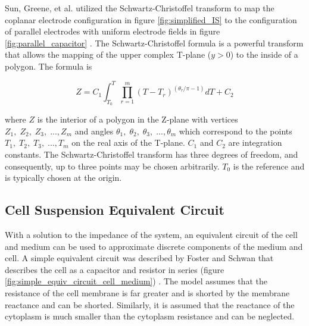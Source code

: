  
    \par Sun, Greene, et al. utilized the Schwartz-Christoffel transform to map the coplanar electrode configuration in figure \ref{fig:simplified_IS} to the configuration of parallel electrodes with uniform electrode fields in figure \ref{fig:parallel_capacitor} \cite{sun_analytical_2007}. The Schwartz-Christoffel formula is a powerful transform that allows the mapping of the upper complex T-plane ($y>0$) to the inside of a polygon. The formula is
    
    \begin{equation}
        Z = C_1 \int_{T_0}^T \prod^m_{r=1} (T - T_r)^{(\theta_r/\pi - 1)} dT + C_2
    \end{equation}
    
    \noindent where $Z$ is the interior of a polygon in the Z-plane with vertices $Z_1,\;Z_2,\;Z_3,\; ...,Z_m$ and angles $\theta_1,\;\theta_2,\;\theta_3,\; ...,\theta_m$ which correspond to the points $T_1,\;T_2,\;T_3,\; ...,T_m$ on the real axis of the T-plane. $C_1$ and $C_2$ are integration constants. The Schwartz-Christoffel transform has three degrees of freedom, and consequently, up to three points may be chosen arbitrarily. $T_0$ is the reference and is typically chosen at the origin.
    
    
 
    
 \subsection{Cell Suspension Equivalent Circuit}
 \label{sec: cell_suspension_equiv_circ}
 \par With a solution to the impedance of the system, an equivalent circuit of the cell and medium can be used to approximate discrete components of the medium and cell. A simple equivalent circuit was described by Foster and Schwan that describes the cell as a capacitor and resistor in series (figure \ref{fig:simple_equiv_circuit_cell_medium}) \cite{schwan_electrical_1994}. The model assumes that the resistance of the cell membrane is far greater and is shorted by the membrane reactance and can be shorted. Similarly, it is assumed that the reactance of the cytoplasm is much smaller than the cytoplasm resistance and can be neglected.
 
